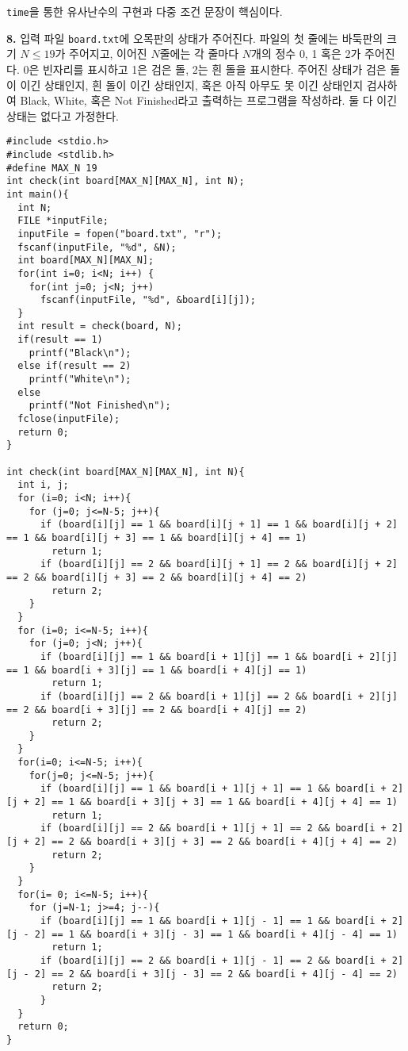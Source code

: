 \documentclass[a4paper,chapter,atbegshi]{oblivoir}
\begin{document}
\texttt{time}을 통한 유사난수의 구현과 다중 조건 문장이 핵심이다.
\hfill\break
\begin{mdframed}\textbf{8. }
  입력 파일 \texttt{board.txt}에 오목판의 상태가 주어진다. 파일의 첫 줄에는
  바둑판의 크기 $N\leq19$가 주어지고, 이어진 $N$줄에는 각 줄마다 $N$개의
  정수 0, 1 혹은 2가 주어진다. 0은 빈자리를 표시하고 1은 검은 돌, 2는 흰 돌을
  표시한다. 주어진 상태가 검은 돌이 이긴 상태인지, 흰 돌이 이긴 상태인지, 혹은
  아직 아무도 못 이긴 상태인지 검사하여 Black, White, 혹은 Not Finished라고
  출력하는 프로그램을 작성하라. 둘 다 이긴 상태는 없다고 가정한다.
\end{mdframed}
\begin{lstlisting}[style=C]
#include <stdio.h>
#include <stdlib.h>
#define MAX_N 19
int check(int board[MAX_N][MAX_N], int N);
int main(){
  int N;
  FILE *inputFile;
  inputFile = fopen("board.txt", "r");
  fscanf(inputFile, "%d", &N);
  int board[MAX_N][MAX_N];
  for(int i=0; i<N; i++) {
    for(int j=0; j<N; j++)
      fscanf(inputFile, "%d", &board[i][j]);
  }
  int result = check(board, N);
  if(result == 1) 
    printf("Black\n");
  else if(result == 2)
    printf("White\n");
  else
    printf("Not Finished\n");
  fclose(inputFile);
  return 0;
}

int check(int board[MAX_N][MAX_N], int N){
  int i, j;
  for (i=0; i<N; i++){
    for (j=0; j<=N-5; j++){
      if (board[i][j] == 1 && board[i][j + 1] == 1 && board[i][j + 2] == 1 && board[i][j + 3] == 1 && board[i][j + 4] == 1)
        return 1;
      if (board[i][j] == 2 && board[i][j + 1] == 2 && board[i][j + 2] == 2 && board[i][j + 3] == 2 && board[i][j + 4] == 2) 
        return 2; 
    }
  }
  for (i=0; i<=N-5; i++){
    for (j=0; j<N; j++){
      if (board[i][j] == 1 && board[i + 1][j] == 1 && board[i + 2][j] == 1 && board[i + 3][j] == 1 && board[i + 4][j] == 1)
        return 1; 
      if (board[i][j] == 2 && board[i + 1][j] == 2 && board[i + 2][j] == 2 && board[i + 3][j] == 2 && board[i + 4][j] == 2)
        return 2; 
    }
  }
  for(i=0; i<=N-5; i++){
    for(j=0; j<=N-5; j++){
      if (board[i][j] == 1 && board[i + 1][j + 1] == 1 && board[i + 2][j + 2] == 1 && board[i + 3][j + 3] == 1 && board[i + 4][j + 4] == 1)
        return 1;
      if (board[i][j] == 2 && board[i + 1][j + 1] == 2 && board[i + 2][j + 2] == 2 && board[i + 3][j + 3] == 2 && board[i + 4][j + 4] == 2)
        return 2;
    }
  }
  for(i= 0; i<=N-5; i++){
    for (j=N-1; j>=4; j--){
      if (board[i][j] == 1 && board[i + 1][j - 1] == 1 && board[i + 2][j - 2] == 1 && board[i + 3][j - 3] == 1 && board[i + 4][j - 4] == 1)
        return 1; 
      if (board[i][j] == 2 && board[i + 1][j - 1] == 2 && board[i + 2][j - 2] == 2 && board[i + 3][j - 3] == 2 && board[i + 4][j - 4] == 2)
        return 2;
      }
  }
  return 0;
}
\end{lstlisting}
\end{document}
